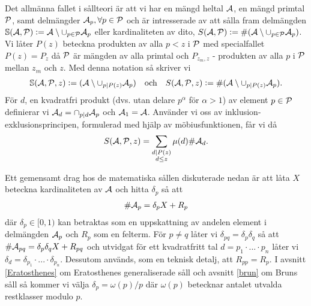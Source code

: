 Det allmänna fallet i sållteori är att vi har en mängd heltal \(\A\), en mängd primtal \(\P\), samt delmängder \(\A_p, \forall p \in \P\) och är intresserade av att sålla fram delmängden \(\mathbb{S}(\A, \P) := \A \setminus \cup_{p \in \P} \A_p\) eller kardinaliteten av dito, \(S(\A, \P) :=\card{(\A \setminus \cup_{p \in \P} \A_p)}\). Vi låter \(P(z)\) beteckna produkten av alla \(p < z\) i \(\P\) med specialfallet \(P(z) = P_z\) då \(\P\) är mängden av alla primtal och \(P_{z_m, z}\) - produkten av alla \(p\) i \(\P\) mellan \(z_m\) och \(z\). Med denna notation så skriver vi %
\begin{align*}
    \mathbb{S}(\A, \P, z) := (\A \setminus \cup_{p \divides P(z)} \A_p)
    \quad \text{och} \quad
    \S{A}{P}{z} := \card{(\A \setminus \cup_{p \divides P(z)} \A_p)} .
\end{align*}
För \(d\), en kvadratfri produkt (dvs. utan delare \(p^\alpha\) för \(\alpha > 1\)) av element \(p \in \P\) definierar vi \(\A_d = \cap_{p \divides d} \A_p\) och \(\A_1 = \A\). Använder vi oss av inklusion-exklusionsprincipen, formulerad med hjälp av möbiusfunktionen, får vi då
\begin{align*}
    \S{A}{P}{z} = \sum_{\substack{d \divides P(z) \\ d \leq z}} \mu(d) \card{\A_d} .
\end{align*} %

Ett gemensamt drag hos de matematiska sållen diskuterade nedan är att låta \(X\) beteckna kardinaliteten av \(\A\) och hitta \(\delta_p\) så att
\begin{align} 
    \card{\A_p} = \delta_p X + R_p\label{deltaX}
\end{align}
där \(\delta_p \in [0, 1)\) kan betraktas som en uppskattning av andelen element i delmängden \(\A_p\) och \(R_p\) som en felterm. För \(p \neq q\) låter vi \(\delta_{pq} = \delta_p \delta_q\) så att \(\card{\A_{pq}} = \delta_p \delta_q X + R_{pq}\) och utvidgat för ett kvadratfritt tal \(d = p_1 \cdot ... \cdot p_n\) låter vi \(\delta_{d} = \delta_{p_1} \cdot ... \cdot \delta_{p_n}\). Dessutom används, som en teknisk detalj, att \(R_{pp} = R_p\). I avsnitt \ref{Eratosthenes} om Eratosthenes generaliserade såll och avsnitt \ref{brun} om Bruns såll så kommer vi välja \(\delta_p = \omega(p) / p\) där \(\omega(p)\) betecknar antalet utvalda restklasser modulo \(p\).
